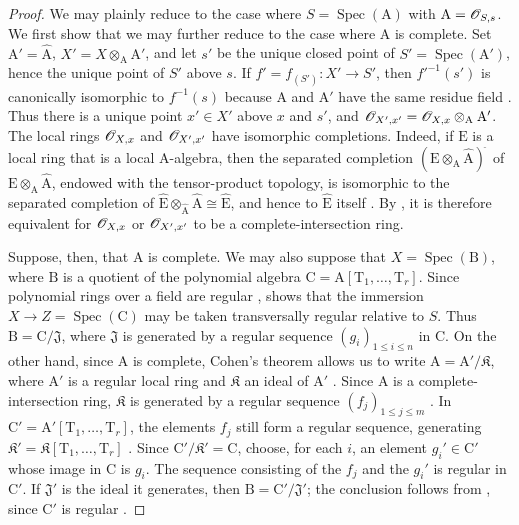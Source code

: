 \begin{proof}
We may plainly reduce to the case where $S=\operatorname{Spec}(\mathrm{A})$ with $\mathrm{A}=\mathscr{O}_{S,s}$. We first show that we may further reduce to the case where $\mathrm{A}$ is complete.
Set $\mathrm{A}'=\widehat{\mathrm{A}}$, $X'=X\otimes_{\mathrm{A}}\mathrm{A}'$, and let $s'$ be the unique closed point of $S'=\operatorname{Spec}(\mathrm{A}')$, hence the unique point of $S'$ above $s$. If $f'=f_{(S')}:X'\to S'$, then $f'^{-1}(s')$ is canonically isomorphic to $f^{-1}(s)$ because $\mathrm{A}$ and $\mathrm{A}'$ have the same residue field . Thus there is a unique point $x'\in X'$ above $x$ and $s'$, and $\mathscr{O}_{X',x'}=\mathscr{O}_{X,x}\otimes_{\mathrm{A}}\mathrm{A}'$.
The local rings $\mathscr{O}_{X,x}$ and $\mathscr{O}_{X',x'}$ have isomorphic completions. Indeed, if $\mathrm{E}$ is a local ring that is a local $\mathrm{A}$-algebra, then the separated completion $(\mathrm{E}\otimes_{\mathrm{A}}\widehat{\mathrm{A}})^{\widehat{\,}}$ of $\mathrm{E}\otimes_{\mathrm{A}}\widehat{\mathrm{A}}$, endowed with the tensor-product topology, is isomorphic to the separated completion of $\widehat{\mathrm{E}}\otimes_{\widehat{\mathrm{A}}}\widehat{\mathrm{A}}\cong\widehat{\mathrm{E}}$, and hence to $\widehat{\mathrm{E}}$ itself . By , it is therefore equivalent for $\mathscr{O}_{X,x}$ or $\mathscr{O}_{X',x'}$ to be a complete-intersection ring.

Suppose, then, that $\mathrm{A}$ is complete. We may also suppose that $X=\operatorname{Spec}(\mathrm{B})$, where $\mathrm{B}$ is a quotient of the polynomial algebra $\mathrm{C}=\mathrm{A}[\mathrm{T}_1,\ldots,\mathrm{T}_r]$. Since polynomial rings over a field are regular ,  shows that the immersion $X\to Z=\operatorname{Spec}(\mathrm{C})$ may be taken transversally regular relative to $S$. Thus $\mathrm{B}=\mathrm{C}/\mathfrak{J}$, where $\mathfrak{J}$ is generated by a regular sequence $(g_i)_{1\leq i\leq n}$ in $\mathrm{C}$.
On the other hand, since $\mathrm{A}$ is complete, Cohen's theorem allows us to write $\mathrm{A}=\mathrm{A}'/\mathfrak K$, where $\mathrm{A}'$ is a regular local ring and $\mathfrak K$ an ideal of $\mathrm{A}'$ . Since $\mathrm{A}$ is a complete-intersection ring, $\mathfrak K$ is generated by a regular sequence $(f_j)_{1\leq j\leq m}$ .
In $\mathrm{C}'=\mathrm{A}'[\mathrm{T}_1,\ldots,\mathrm{T}_r]$, the elements $f_j$ still form a regular sequence, generating $\mathfrak K'=\mathfrak K[\mathrm{T}_1,\ldots,\mathrm{T}_r]$ . Since $\mathrm{C}'/\mathfrak K'=\mathrm{C}$, choose, for each $i$, an element $g_i'\in\mathrm{C}'$ whose image in $\mathrm{C}$ is $g_i$. The sequence consisting of the $f_j$ and the $g_i'$ is regular in $\mathrm{C}'$. If $\mathfrak{J}'$ is the ideal it generates, then $\mathrm{B}=\mathrm{C}'/\mathfrak{J}'$; the conclusion follows from , since $\mathrm{C}'$ is regular .
\end{proof}

